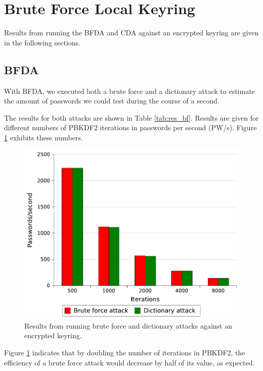 \documentclass[pdftex,english,10pt,b5paper,twoside]{book}
\begin{document}
\section{Brute Force Local Keyring}
\label{sec:R:BFLK}
Results from running the \ac{BFDA} and \ac{CDA} against an encrypted keyring are
given in the following sections.

\subsection{\acl{BFDA}}

With \ac{BFDA}, we executed both a brute force and a dictionary attack to
estimate the amount of passwords we could test during the course of a second.

The results for both attacks are shown in Table \ref{tab:res_bf}. Results
are given for different numbers of \ac{PBKDF2} iterations in passwords per
second (PW/s). Figure \ref{fig:bfres} exhibits these numbers.



\begin{figure}[!h]
\centering
\includegraphics[scale=0.55]{graph_pbkdf2.pdf}
\caption{Results from running brute force and dictionary attacks against an encrypted keyring.}
\label{fig:bfres}
\end{figure}

Figure \ref{fig:bfres} indicates that by doubling the number of iterations in
PBKDF2, the efficiency of a brute force attack would decrease by half of
its value, as expected.
\end{document}
